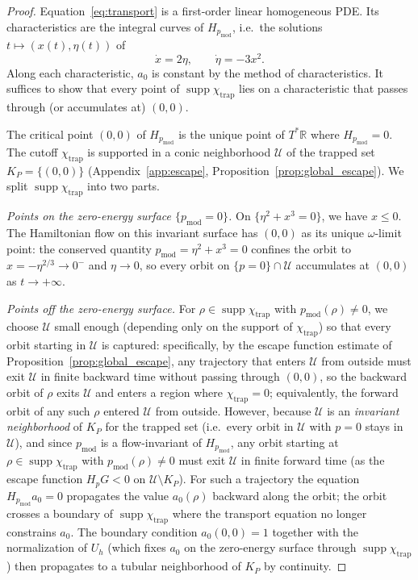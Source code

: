 \documentclass[12pt,a4paper]{amsart}
\theoremstyle{remark}
\begin{document}
\begin{proof}
Equation~\eqref{eq:transport} is a first-order linear homogeneous PDE.
Its characteristics are the integral curves of $H_{p_{\mathrm{mod}}}$,
i.e.\ the solutions $t \mapsto (x(t), \eta(t))$ of
\[
  \dot x = 2\eta, \qquad \dot\eta = -3x^2.
\]
Along each characteristic, $a_0$ is constant by the method of characteristics.
It suffices to show that every point of $\operatorname{supp}\chi_{\mathrm{trap}}$
lies on a characteristic that passes through (or accumulates at) $(0,0)$.

The critical point $(0,0)$ of $H_{p_{\mathrm{mod}}}$ is the unique point of
$T^*\mathbb{R}$ where $H_{p_{\mathrm{mod}}} = 0$.
The cutoff $\chi_{\mathrm{trap}}$ is supported in a conic neighborhood
$\mathcal{U}$ of the trapped set $K_P = \{(0,0)\}$
(Appendix~\ref{app:escape}, Proposition~\ref{prop:global_escape}).
We split $\operatorname{supp}\chi_{\mathrm{trap}}$ into two parts.

\emph{Points on the zero-energy surface $\{p_{\mathrm{mod}} = 0\}$.}
On $\{\eta^2 + x^3 = 0\}$, we have $x \leq 0$.
The Hamiltonian flow on this invariant surface has $(0,0)$ as its unique
$\omega$-limit point: the conserved quantity $p_{\mathrm{mod}} = \eta^2 + x^3 = 0$
confines the orbit to $x = -\eta^{2/3} \to 0^-$ and $\eta \to 0$, so
every orbit on $\{p = 0\} \cap \mathcal{U}$ accumulates at $(0,0)$ as $t \to +\infty$.

\emph{Points off the zero-energy surface.}
For $\rho \in \operatorname{supp}\chi_{\mathrm{trap}}$ with $p_{\mathrm{mod}}(\rho) \neq 0$,
we choose $\mathcal{U}$ small enough (depending only on the support of $\chi_{\mathrm{trap}}$)
so that every orbit starting in $\mathcal{U}$ is captured: specifically, by the escape
function estimate of Proposition~\ref{prop:global_escape}, any trajectory that enters
$\mathcal{U}$ from outside must exit $\mathcal{U}$ in finite backward time without
passing through $(0,0)$, so the backward orbit of $\rho$ exits $\mathcal{U}$ and
enters a region where $\chi_{\mathrm{trap}} = 0$; equivalently, the forward orbit
of any such $\rho$ entered $\mathcal{U}$ from outside.
However, because $\mathcal{U}$ is an \emph{invariant neighborhood} of $K_P$ for the
trapped set (i.e.\ every orbit in $\mathcal{U}$ with $p = 0$ stays in $\mathcal{U}$),
and since $p_{\mathrm{mod}}$ is a flow-invariant of $H_{p_{\mathrm{mod}}}$,
any orbit starting at $\rho \in \operatorname{supp}\chi_{\mathrm{trap}}$
with $p_{\mathrm{mod}}(\rho) \neq 0$ must exit $\mathcal{U}$ in finite forward time
(as the escape function $H_p G < 0$ on $\mathcal{U} \setminus K_P$).
For such a trajectory the equation $H_{p_{\mathrm{mod}}} a_0 = 0$ propagates
the value $a_0(\rho)$ backward along the orbit; the orbit crosses a boundary
of $\operatorname{supp}\chi_{\mathrm{trap}}$ where the transport equation
no longer constrains $a_0$. The boundary condition $a_0(0,0) = 1$ together
with the normalization of $U_h$ (which fixes $a_0$ on the zero-energy surface
through $\operatorname{supp}\chi_{\mathrm{trap}}$) then propagates to
a tubular neighborhood of $K_P$ by continuity.


\end{proof}
\end{document}
